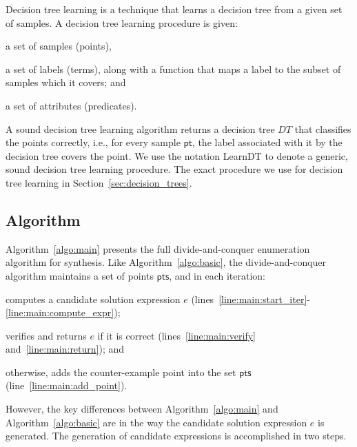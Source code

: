 \documentclass{llncs}
\newcommand\Points{\mathsf{pts}}
\newcommand\Point{\mathsf{pt}}
\newcommand\Expr{e}
\newcommand\DecisionTree{\mathit{DT}}
\begin{document}
\noindent
Decision tree learning is a technique that learns a decision tree from a
given set of samples.
A decision tree learning procedure is given:
\begin{inparaenum}[(a)]
\item a set of samples (points),
\item a set of labels (terms), along with a function that maps a label to the
  subset of samples which it covers; and
\item a set of attributes (predicates).
\end{inparaenum}
A sound decision tree learning algorithm returns a decision tree
$\DecisionTree$ that classifies the points correctly, i.e., for every
sample $\Point$, the label associated with it by the decision tree covers
the point.
We use the notation {\sc LearnDT} to denote a generic, sound
decision tree learning procedure.
The exact procedure we use for decision tree learning in
Section~\ref{sec:decision_trees}.

\vspace*{-2ex}
\subsection{Algorithm}
\label{sec:algo:main}

Algorithm~\ref{algo:main} presents the full divide-and-conquer
enumeration algorithm for synthesis.
Like Algorithm~\ref{algo:basic}, the divide-and-conquer algorithm
maintains a set of points $\Points$, and in each iteration:
\begin{inparaenum}[(a)]
\item computes a candidate solution expression $\Expr$
  (lines~\ref{line:main:start_iter}-\ref{line:main:compute_expr});
\item verifies and returns $\Expr$ if it is correct (lines~\ref{line:main:verify}
  and~\ref{line:main:return}); and
\item otherwise, adds the counter-example point into the set $\Points$
  (line~\ref{line:main:add_point}).
\end{inparaenum}

However, the key differences between Algorithm~\ref{algo:main} and
Algorithm~\ref{algo:basic} are in the way the candidate solution
expression $\Expr$ is generated.
The generation of candidate expressions is accomplished in two
steps.
\end{document}
